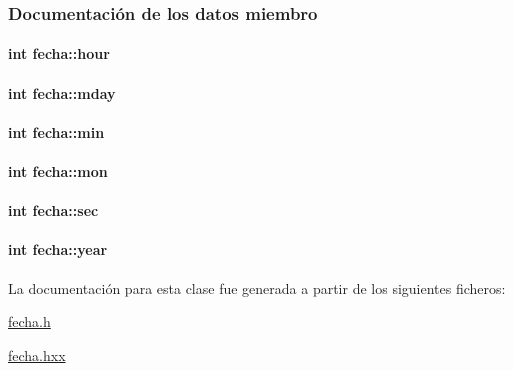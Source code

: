 \subsubsection{Documentación de los datos miembro}
\hypertarget{classfecha_a895a2cc9dd11326a8392a4c6fc928a14}{
\paragraph[{hour}]{\setlength{\rightskip}{0pt plus 5cm}int fecha\+::hour\hspace{0.3cm}{\ttfamily [private]}}}\label{classfecha_a895a2cc9dd11326a8392a4c6fc928a14}
\hypertarget{classfecha_a9c1dc50e5f5efcd3e30a981bfd495b1d}{
\paragraph[{mday}]{\setlength{\rightskip}{0pt plus 5cm}int fecha\+::mday\hspace{0.3cm}{\ttfamily [private]}}}\label{classfecha_a9c1dc50e5f5efcd3e30a981bfd495b1d}
\hypertarget{classfecha_a3875f28ff6e7c383923c80e86afaec2e}{
\paragraph[{min}]{\setlength{\rightskip}{0pt plus 5cm}int fecha\+::min\hspace{0.3cm}{\ttfamily [private]}}}\label{classfecha_a3875f28ff6e7c383923c80e86afaec2e}
\hypertarget{classfecha_a5c86be74f1215600f99798d54126ba16}{
\paragraph[{mon}]{\setlength{\rightskip}{0pt plus 5cm}int fecha\+::mon\hspace{0.3cm}{\ttfamily [private]}}}\label{classfecha_a5c86be74f1215600f99798d54126ba16}
\hypertarget{classfecha_a09eb9f4865c9ff896f438b8df3cf6485}{
\paragraph[{sec}]{\setlength{\rightskip}{0pt plus 5cm}int fecha\+::sec\hspace{0.3cm}{\ttfamily [private]}}}\label{classfecha_a09eb9f4865c9ff896f438b8df3cf6485}
\hypertarget{classfecha_a4d06534f05a6350ae229ce2b17b860e8}{
\paragraph[{year}]{\setlength{\rightskip}{0pt plus 5cm}int fecha\+::year\hspace{0.3cm}{\ttfamily [private]}}}\label{classfecha_a4d06534f05a6350ae229ce2b17b860e8}


La documentación para esta clase fue generada a partir de los siguientes ficheros\+:\begin{DoxyCompactItemize}
\item 
\hyperlink{fecha_8h}{fecha.\+h}\item 
\hyperlink{fecha_8hxx}{fecha.\+hxx}\end{DoxyCompactItemize}
